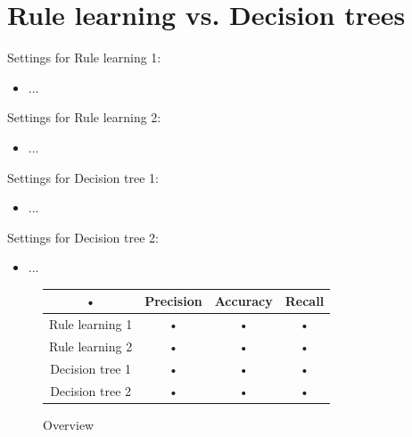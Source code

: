 \documentclass[12pt,a4paper]{article}
\begin{document}
\section{Rule learning vs. Decision trees}

Settings for Rule learning 1:
\begin{itemize}
\item ...
\end{itemize}

Settings for Rule learning 2:
\begin{itemize}
\item ...
\end{itemize}

Settings for Decision tree 1:
\begin{itemize}
\item ...
\end{itemize}

Settings for Decision tree 2:
\begin{itemize}
\item ...
\end{itemize}

\begin{figure}[H]
\centering
\begin{tabular}{|c|c|c|c|}
\hline 
• & Precision & Accuracy & Recall\\ 
\hline 
Rule learning 1 & • & • & • \\ 
\hline 
Rule learning 2 & • & • & • \\ 
\hline 
Decision tree 1 & • & • & • \\ 
\hline 
Decision tree 2 & • & • & • \\ 
\hline 
\end{tabular} 
\caption{Overview}
\end{figure}
\end{document}
